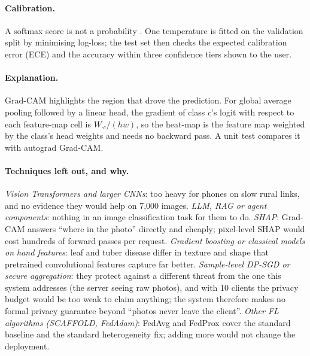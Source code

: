 \documentclass[11pt,a4paper]{article}
\begin{document}
\paragraph{Calibration.} A softmax score is not a probability \citep{guo2017calibration}. One temperature is fitted on the validation split by minimising log-loss; the test set then checks the expected calibration error (ECE) and the accuracy within three confidence tiers shown to the user.

\paragraph{Explanation.} Grad-CAM \citep{selvaraju2017gradcam} highlights the region that drove the prediction. For global average pooling followed by a linear head, the gradient of class $c$'s logit with respect to each feature-map cell is $W_{\cdot c}/(hw)$, so the heat-map is the feature map weighted by the class's head weights and needs no backward pass. A unit test compares it with autograd Grad-CAM.

\paragraph{Techniques left out, and why.} \emph{Vision Transformers and larger CNNs}: too heavy for phones on slow rural links, and no evidence they would help on 7,000 images. \emph{LLM, RAG or agent components}: nothing in an image classification task for them to do. \emph{SHAP}: Grad-CAM answers ``where in the photo'' directly and cheaply; pixel-level SHAP would cost hundreds of forward passes per request. \emph{Gradient boosting or classical models on hand features}: leaf and tuber disease differ in texture and shape that pretrained convolutional features capture far better. \emph{Sample-level DP-SGD or secure aggregation}: they protect against a different threat from the one this system addresses (the server seeing raw photos), and with 10 clients the privacy budget would be too weak to claim anything; the system therefore makes no formal privacy guarantee beyond ``photos never leave the client''. \emph{Other FL algorithms (SCAFFOLD, FedAdam)}: FedAvg and FedProx cover the standard baseline and the standard heterogeneity fix; adding more would not change the deployment.
\end{document}
